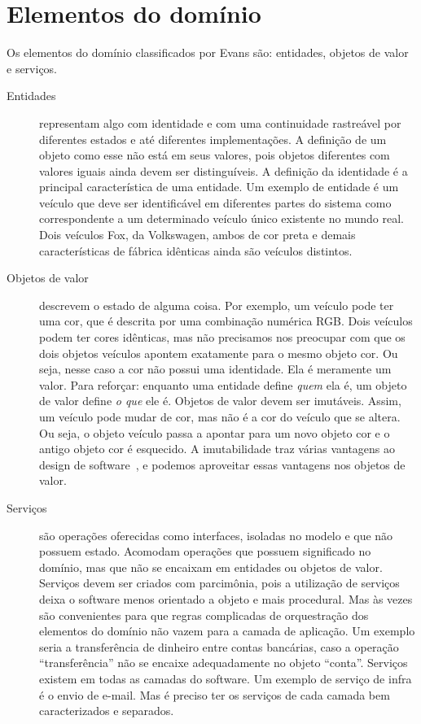 \documentclass[a4paper, 12pt]{article}
\begin{document}
\section{Elementos do domínio}

Os elementos do domínio classificados por Evans são: entidades, objetos de valor e serviços.

\begin{description}

\item [Entidades] representam algo com identidade e com uma continuidade rastreável por diferentes estados e até diferentes implementações. A definição de um objeto como esse não está em seus valores, pois objetos diferentes com valores iguais ainda devem ser distinguíveis. A definição da identidade é a principal característica de uma entidade. Um exemplo de entidade é um veículo que deve ser identificável em diferentes partes do sistema como correspondente a um determinado veículo único existente no mundo real. Dois veículos Fox, da Volkswagen, ambos de cor preta e demais características de fábrica idênticas ainda são veículos distintos.

\item [Objetos de valor] descrevem o estado de alguma coisa. Por exemplo, um veículo pode ter uma cor, que é descrita por uma combinação numérica RGB. Dois veículos podem ter cores idênticas, mas não precisamos nos preocupar com que os dois objetos veículos apontem exatamente para o mesmo objeto cor. Ou seja, nesse caso a cor não possui uma identidade. Ela é meramente um valor. Para reforçar: enquanto uma entidade define \emph{quem} ela é, um objeto de valor define \emph{o que} ele é. Objetos de valor devem ser imutáveis. Assim, um veículo pode mudar de cor, mas não é a cor do veículo que se altera. Ou seja, o objeto veículo passa a apontar para um novo objeto cor e o antigo objeto cor é esquecido. A imutabilidade traz várias vantagens ao design de software~\cite{Bloch2008Mutability}, e podemos aproveitar essas vantagens nos objetos de valor.

\item [Serviços] são operações oferecidas como interfaces, isoladas no modelo e que não possuem estado. Acomodam operações que possuem significado no domínio, mas que não se encaixam em entidades ou objetos de valor. Serviços devem ser criados com parcimônia, pois a utilização de serviços deixa o software menos orientado a objeto e mais procedural. Mas às vezes são convenientes para que regras complicadas de orquestração dos elementos do domínio não vazem para a camada de aplicação. Um exemplo seria a transferência de dinheiro entre contas bancárias, caso a operação ``transferência'' não se encaixe adequadamente no objeto ``conta''. Serviços existem em todas as camadas do software. Um exemplo de serviço de infra é o envio de e-mail. Mas é preciso ter os serviços de cada camada bem caracterizados e separados.


\end{description}
\end{document}
